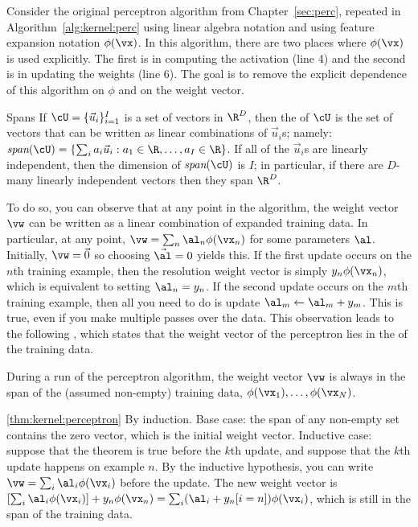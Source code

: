 Consider the original perceptron algorithm from
Chapter~\ref{sec:perc}, repeated in Algorithm~\ref{alg:kernel:perc}
using linear algebra notation and using feature expansion notation
$\phi(\vx)$.  In this algorithm, there are two places where
$\phi(\vx)$ is used explicitly.  The first is in computing the
activation (line 4) and the second is in updating the weights (line
6).  The goal is to remove the explicit dependence of this algorithm
on $\phi$ and on the weight vector.

\begin{mathreview}{Spans}
  If $\cU = \{ \vec u_i \}_{i=1}^I$ is a set of vectors in $\R^D$, then
  the  of $\cU$ is the set of vectors that can be written as
  linear combinations of $\vec u_i$s; namely: $\textit{span}(\cU) = \{
  \sum_i a_i \vec u_i : a_1 \in \R, \dots, a_I \in \R \}$.
  If all of the $\vec u_i$s are linearly independent, then the dimension
  of $\textit{span}(\cU)$ is $I$; in particular, if there are $D$-many
  linearly independent vectors then they span $\R^D$.
\end{mathreview}

To do so, you can observe that at any point in the algorithm, the
weight vector $\vw$ can be written as a linear combination of expanded
training data.  In particular, at any point, $\vw = \sum_n \al_n
\phi(\vx_n)$ for some parameters $\al$.  Initially, $\vw = \vec 0$ so
choosing $\vec\al = 0$ yields this.  If the first update occurs on the
$n$th training example, then the resolution weight vector is simply
$y_n \phi(\vx_n)$, which is equivalent to setting $\al_n = y_n$.  If
the second update occurs on the $m$th training example, then all you
need to do is update $\al_m \leftarrow \al_m + y_m$.  This is true,
even if you make multiple passes over the data.  This observation
leads to the following , which states
that the weight vector of the perceptron lies in the  of
the training data.

\begin{theorem} \label{thm:kernel:perceptron}
  During a run of the perceptron algorithm, the weight vector $\vw$ is
  always in the span of the (assumed non-empty) training data,
  $\phi(\vx_1), \dots, \phi(\vx_N)$.
\end{theorem}
\begin{myproof}{\ref{thm:kernel:perceptron}}
  By induction.  Base case: the span of any non-empty set contains the
  zero vector, which is the initial weight vector.  Inductive case:
  suppose that the theorem is true before the $k$th update, and
  suppose that the $k$th update happens on example $n$.  By the
  inductive hypothesis, you can write $\vw = \sum_i \al_i \phi(\vx_i)$
  before the update.  The new weight vector is $\left[ \sum_i \al_i
    \phi(\vx_i) \right] + y_n \phi(\vx_n) = \sum_i (\al_i + y_n[i=n])
  \phi(\vx_i)$, which is still in the span of the training data.
\end{myproof}

